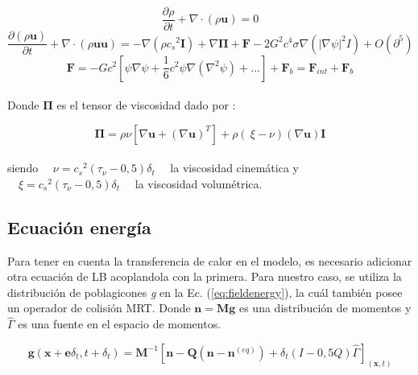 \begin{equation}
	\frac{\partial \rho }{\partial t}  + \nabla \cdot \left( \rho \mathbf{u} \right) = 0
\end{equation}
\begin{equation}
	\frac{\partial \left( \rho \mathbf{u}\right)}{\partial t} + \nabla \cdot \left( \rho \mathbf{u} \mathbf{u}\right) = - \nabla \left( \rho {c_{s}}^{2} \mathbf{I} \right) + \nabla \mathbf{\Pi} + \mathbf{F} - 2 G^{2} c^{4} \sigma \nabla \left( {|\nabla \psi	|}^{2} I	\right) + O (\partial^{5})
\end{equation}
\begin{equation}
\mathbf{F} = - G c^{2} \left[	\psi \nabla \psi + \frac{1}{6} c^{2} \psi \nabla \left( \nabla^{2} \psi\right) + ...\right] + \mathbf{F}_{b} = \mathbf{F}_{int} + \mathbf{F}_{b}
\end{equation}
\\
Donde $\mathbf{\Pi}$ es el tensor de viscosidad dado por :

\begin{equation}
	\mathbf{\Pi} = \rho \nu \left[	\nabla \mathbf{u} + {\left(\nabla \mathbf{u}\right)}^{T}\right] + \rho \left(\ \xi - \nu \right) \left( \nabla \mathbf{u}\right) \mathbf{I}
\end{equation}
\\
siendo $\quad\nu = {c_{s}}^{2} (\tau_{\nu}- 0,5) \delta_{t}\quad$ la viscosidad cinemática y $\quad\xi = {c_{s}}^{2} (\tau_{\nu}- 0,5) \delta_{t}\quad$ la viscosidad volumétrica.



\subsection{Ecuación energía}

Para tener en cuenta la transferencia de calor en el modelo, es necesario adicionar otra ecuación de LB acoplandola con la primera\cite{li2013lattice}. Para nuestro caso, se utiliza la distribución de poblagicones \textit{g} en la Ec. (\ref{eq:fieldenergy}), la cuál también posee un operador de colisión MRT. Donde $\mathbf{n} = \mathbf{M} \mathbf{g}$ es una distribución de momentos y $\hat{\Gamma}$ es una fuente en el espacio de momentos.


\begin{equation}
    \mathbf{g}(\mathbf{x} + \mathbf{e} \delta_{t} ,t + \delta_{t}) = \mathbf{M}^{-1} \left[ \mathbf{n} - \mathbf{Q}(\mathbf{n} - \mathbf{n}^{(eq)}) + \delta_{t} \left( I - 0,5 Q \right) \hat{\Gamma}  \right]_{(\mathbf{x},t)}
    \label{eq:fieldenergy}
\end{equation}

